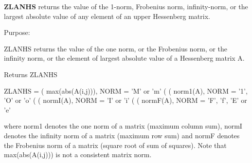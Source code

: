 {\bfseries Z\+L\+A\+N\+H\+S} returns the value of the 1-\/norm, Frobenius norm, infinity-\/norm, or the largest absolute value of any element of an upper Hessenberg matrix. 

 \begin{DoxyParagraph}{Purpose\+: }
\begin{DoxyVerb} ZLANHS  returns the value of the one norm,  or the Frobenius norm, or
 the  infinity norm,  or the  element of  largest absolute value  of a
 Hessenberg matrix A.\end{DoxyVerb}

\end{DoxyParagraph}
\begin{DoxyReturn}{Returns}
Z\+L\+A\+N\+H\+S \begin{DoxyVerb}    ZLANHS = ( max(abs(A(i,j))), NORM = 'M' or 'm'
             (
             ( norm1(A),         NORM = '1', 'O' or 'o'
             (
             ( normI(A),         NORM = 'I' or 'i'
             (
             ( normF(A),         NORM = 'F', 'f', 'E' or 'e'

 where  norm1  denotes the  one norm of a matrix (maximum column sum),
 normI  denotes the  infinity norm  of a matrix  (maximum row sum) and
 normF  denotes the  Frobenius norm of a matrix (square root of sum of
 squares).  Note that  max(abs(A(i,j)))  is not a consistent matrix norm.\end{DoxyVerb}
 
\end{DoxyReturn}

